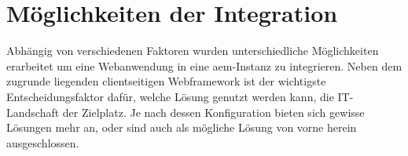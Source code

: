 \section{Möglichkeiten der Integration}
\label{sec:integrationen}
Abhängig von verschiedenen Faktoren wurden unterschiedliche Möglichkeiten erarbeitet um eine Webanwendung in eine \ac{aem}-Instanz zu integrieren. Neben dem zugrunde liegenden clientseitigen Webframework ist der wichtigste Entscheidungsfaktor dafür, welche Lösung genutzt werden kann, die IT-Landschaft der Zielplatz. Je nach dessen Konfiguration bieten sich gewisse Lösungen mehr an, oder sind auch als mögliche Lösung von vorne herein ausgeschlossen.





